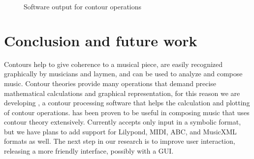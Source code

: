 \begin{figure*}
  \centering
  \caption{Software output for  contour operations}
  \label{fig:output-fugato}
\end{figure*}

\section{Conclusion and future work}
\label{sec:conclusion-future-work}

Contours help to give coherence to a musical piece, are easily
recognized graphically by musicians and laymen, and can be used to
analyze and compose music. Contour theories provide many operations
that demand precise mathematical calculations and graphical
representation, for this reason we are developing \goiaba{}, a contour
processing software that helps the calculation and plotting of contour
operations. \goiaba{} has been proven to be useful in composing music
that uses contour theory extensively. Currently \goiaba{} accepts only
input in a symbolic format, but we have plans to add support for
Lilypond, MIDI, ABC, and MusicXML formats as well. The next step in
our research is to improve \goiaba{} user interaction, releasing a
more friendly interface, possibly with a GUI.

